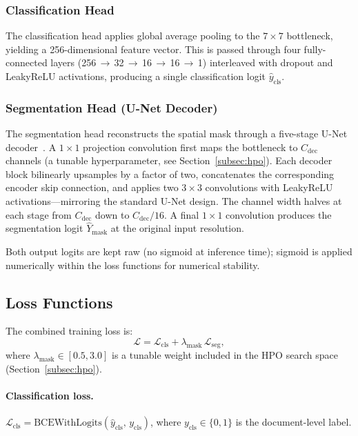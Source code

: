 \subsubsection{Classification Head}

The classification head applies global average pooling to the $7 \times 7$
bottleneck, yielding a 256-dimensional feature vector. This is passed through
four fully-connected layers (256\,$\to$\,32\,$\to$\,16\,$\to$\,16\,$\to$\,1)
interleaved with dropout and LeakyReLU activations, producing a single
classification logit $\hat{y}_{\text{cls}}$.

\subsubsection{Segmentation Head (U-Net Decoder)}

The segmentation head reconstructs the spatial mask through a five-stage U-Net
decoder~\cite{unet2015}. A $1 \times 1$ projection convolution first maps the
bottleneck to $C_{\text{dec}}$ channels (a tunable hyperparameter, see
Section~\ref{subsec:hpo}). Each decoder block bilinearly upsamples by a factor of
two, concatenates the corresponding encoder skip connection, and applies two
$3 \times 3$ convolutions with LeakyReLU activations—mirroring the standard
U-Net design. The channel width halves at each stage from $C_{\text{dec}}$ down
to $C_{\text{dec}}/16$. A final $1 \times 1$ convolution produces the segmentation
logit $\hat{Y}_{\text{mask}}$ at the original input resolution.

Both output logits are kept raw (no sigmoid at inference time); sigmoid is applied
numerically within the loss functions for numerical stability.

\subsection{Loss Functions}
\label{subsec:loss}

The combined training loss is:
\begin{equation}
  \mathcal{L} = \mathcal{L}_{\text{cls}} + \lambda_{\text{mask}} \,
                \mathcal{L}_{\text{seg}},
  \label{eq:total_loss}
\end{equation}
where $\lambda_{\text{mask}} \in [0.5, 3.0]$ is a tunable weight included in the
HPO search space (Section~\ref{subsec:hpo}).

\paragraph{Classification loss.}
$\mathcal{L}_{\text{cls}} = \text{BCEWithLogits}(\hat{y}_{\text{cls}},\, y_{\text{cls}})$,
where $y_{\text{cls}} \in \{0, 1\}$ is the document-level label.

